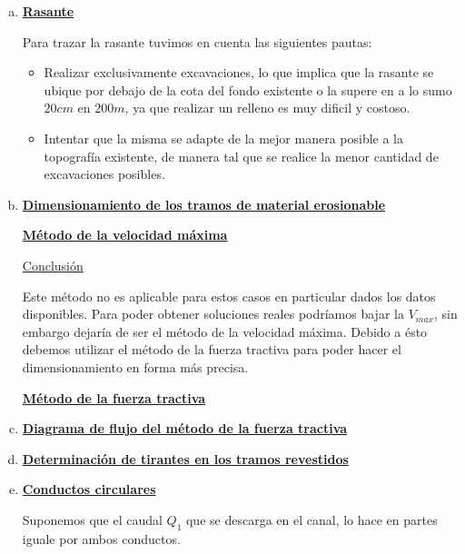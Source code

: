 \documentclass[10.5pt]{article}
\begin{document}
\begin{enumerate}[a)]
 \item \underline{\bf Rasante}
 
 Para trazar la rasante tuvimos en cuenta las siguientes pautas:
  \begin{itemize}
   \item Realizar exclusivamente excavaciones, lo que implica que la rasante se ubique por debajo de la cota del fondo existente o la supere
   en a lo sumo $20 cm$ en $200 m$, ya que realizar un relleno es muy dificil y costoso.
   \item Intentar que la misma se adapte de la mejor manera posible a la topografía existente, de manera tal que se realice la menor cantidad
   de excavaciones posibles.
  \end{itemize}
  
 \item \underline{\bf Dimensionamiento de los tramos de material erosionable}
    
  \underline{\bf Método de la velocidad máxima}
  
  
  
  
  
  \underline{Conclusión}
  
  Este método no es aplicable para estos casos en particular dados los datos disponibles.
  Para poder obtener soluciones reales podríamos bajar la $V_{max}$, sin embargo dejaría de ser el método de la velocidad máxima.
  Debido a ésto debemos utilizar el método de la fuerza tractiva para poder hacer el dimensionamiento en forma más precisa.
  
  \underline{\bf Método de la fuerza tractiva}
  
  
  
  
 
 \newpage
 \item \underline{\bf Diagrama de flujo del método de la fuerza tractiva}
   
   
   
 \item \underline{\bf Determinación de tirantes en los tramos revestidos}

   
   
   
 \item \underline{\bf Conductos circulares}
 
 Suponemos que el caudal $Q_1$ que se descarga en el canal, lo hace en partes iguale por ambos conductos.
 

\end{enumerate}
\end{document}
